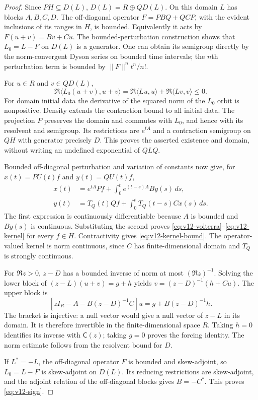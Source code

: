 \begin{proof}
Since $P H\subseteq D(L)$, $D(L)=R\oplus QD(L)$. On this domain
$L$ has blocks $A,B,C,D$. The off-diagonal operator
$F=PBQ+QCP$, with the evident inclusions of its ranges in $H$, is
bounded. Equivalently it acts by $F(u+v)=Bv+Cu$.
The bounded-perturbation construction shows that
$L_0=L-F$ on $D(L)$ is a generator. One can obtain its semigroup directly
by the norm-convergent Dyson series on bounded time intervals; the
$n$th perturbation term is bounded by $\|F\|^n t^n/n!$.

For $u\in R$ and $v\in QD(L)$,
\[
 \Re\langle L_0(u+v),u+v\rangle
   =\Re\langle Lu,u\rangle+\Re\langle Lv,v\rangle\le0.
\]
For domain initial data the derivative of the squared norm of the
$L_0$ orbit is nonpositive. Density extends the contraction bound to all
initial data. The projection $P$ preserves the domain and commutes with
$L_0$, and hence with its resolvent and semigroup. Its restrictions are
$e^{tA}$ and a contraction semigroup on $QH$ with generator precisely
$D$. This proves the asserted existence and domain, without writing an
undefined exponential of $QLQ$.

Bounded off-diagonal perturbation and variation of constants now give,
for $x(t)=PU(t)f$ and $y(t)=QU(t)f$,
\begin{align*}
 x(t)&=e^{tA}Pf+\int_0^t e^{(t-s)A}By(s)\,ds,\\
 y(t)&=T_Q(t)Qf+\int_0^t T_Q(t-s)Cx(s)\,ds.
\end{align*}
The first expression is continuously differentiable because $A$ is
bounded and $By(s)$ is continuous. Substituting the second proves
\eqref{eq:v12-volterra}--\eqref{eq:v12-kernel} for every $f\in H$.
Contractivity gives \eqref{eq:v12-kernel-bound}. The operator-valued
kernel is norm continuous, since $C$ has finite-dimensional domain and
$T_Q$ is strongly continuous.

For $\Re z>0$, $z-D$ has a bounded inverse of norm at most
$(\Re z)^{-1}$. Solving the lower block of $(z-L)(u+v)=g+h$ yields
$v=(z-D)^{-1}(h+Cu)$. The upper block is
\[
 [zI_R-A-B(z-D)^{-1}C]u=g+B(z-D)^{-1}h.
\]
The bracket is injective: a null vector would give a null vector of
$z-L$ in its domain. It is therefore invertible in the finite-dimensional
space $R$. Taking $h=0$ identifies its inverse with $\mathsf C(z)$;
taking $g=0$ proves the forcing identity. The norm estimate follows from
the resolvent bound for $D$.

If $L^*=-L$, the off-diagonal operator $F$ is bounded and skew-adjoint,
so $L_0=L-F$ is skew-adjoint on $D(L)$. Its reducing restrictions are
skew-adjoint, and the adjoint relation of the off-diagonal blocks gives
$B=-C^*$. This proves \eqref{eq:v12-sign}.
\end{proof}

